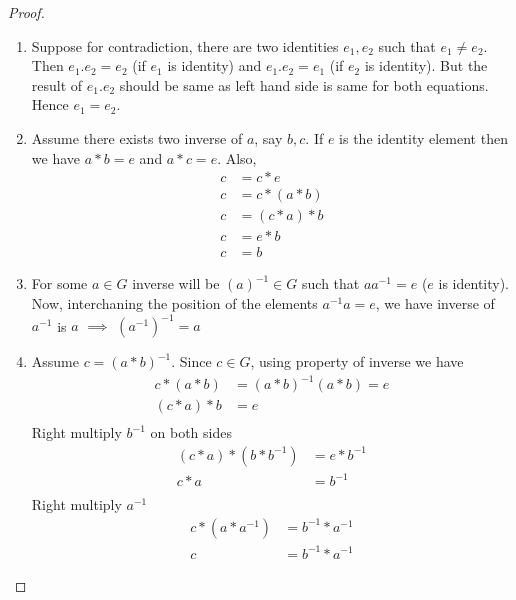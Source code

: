 \documentclass[12pt]{report}
\begin{document}
\begin{proof}
    \begin{enumerate}
        \item Suppose for contradiction, there are two identities $e_1,e_2$ such that $e_1 \neq e_2$. Then $e_1 . e_2 = e_2$ (if $e_1$ is identity) and $e_1 . e_2 = e_1$ (if $e_2$ is identity). But the result of $e_1 . e_2$ should be same as left hand side is same for both equations. Hence $e_1 = e_2$.
        \item Assume there exists two inverse of $a$, say $b,c$. If $e$ is the identity element then we have $a * b = e$ and $a * c = e$. Also, 
        \begin{align*}
            c &= c * e\\
            c &= c * (a*b)\\
            c &= (c*a) *b\\
            c &= e * b\\
            c &= b
        \end{align*}
        \item For some $a \in G$ inverse will be $(a)^{-1} \in G$ such that $aa^{-1} = e$ ($e$ is identity). Now, interchaning the position of the elements $a^{-1}a = e$, we have inverse of $a^{-1}$ is $a$ $\implies$ $(a^{-1})^{-1} = a$
        \item Assume $c = (a * b)^{-1}$. Since $c \in G$, using property of inverse we have
        \begin{align*}
            c * (a * b) &= (a * b)^{-1} (a * b) = e\\
            (c * a) * b &= e \\
        \end{align*} 
        Right multiply $b^{-1}$ on both sides
        \begin{align*}
            (c * a) * (b * b^{-1}) &= e * b^{-1}\\
            c * a &= b^{-1}\\            
        \end{align*}
        Right multiply $a^{-1}$
        \begin{align*}
            c * (a * a^{-1}) &= b^{-1} * a^{-1}\\
            c &= b^{-1} * a^{-1}
        \end{align*}
    \end{enumerate}
\end{proof}
\end{document}
